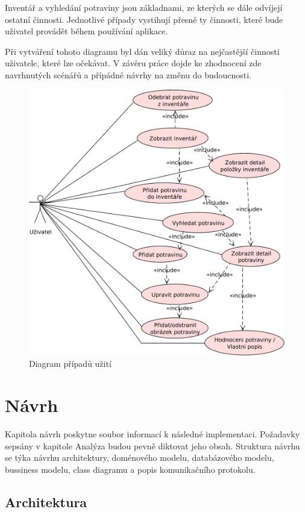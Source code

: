 \documentclass[thesis=B,czech]{FITthesis}[2013/10/20]
\begin{document}
Inventář a vyhledání potraviny jsou základnami, ze kterých se dále odvíjejí ostatní činnosti. Jednotlivé případy vystihují přesně ty činnosti, které bude uživatel provádět během používání aplikace.

Při vytváření tohoto diagramu byl dán veliký důraz na nejčastější činnosti uživatele, které lze očekávat. V závěru práce dojde ke zhodnocení zde navrhnutých scénářů a přípádné návrhy na změnu do budoucnosti.

\begin{figure}[H]
  \centering
  \includegraphics[scale=0.75]{diagrams/use_case}
  \caption{Diagram případů užití}
  \label{fig:UseCase}
\end{figure}

\chapter{Návrh}

Kapitola návrh poskytne soubor informací k následné implementaci. Požadavky sepsány v kapitole Analýza budou pevně diktovat jeho obsah. Struktura návrhu se týka návrhu architektury, doménového modelu, databázového modelu, bussiness modelu, class diagramu a popis komunikačního protokolu.

\section{Architektura}
\end{document}
